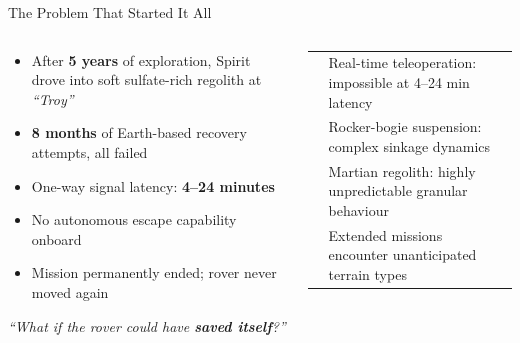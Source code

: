 \documentclass[aspectratio=169, 10pt]{beamer}
\newcommand{\keyword}[1]{\textbf{\color{MarsLight}#1}}
\newcommand{\teal}[1]{{\color{ArcticTeal}#1}}
\newcommand{\rust}[1]{{\color{MarsRust}#1}}
\begin{document}
\begin{frame}{The Problem That Started It All}
\begin{columns}[T]
   \vspace{-1.5em}
  \begin{tcolorbox}[mycard, title={\faRocket\; The Spirit Rover Incident: May 2009}]
    \small
    \begin{itemize}[leftmargin=1em, itemsep=3pt]
      \item[\rust{\faCircle[regular]}] After \keyword{5 years} of exploration, Spirit drove into soft
        sulfate-rich regolith at \textit{``Troy''}
      \item[\rust{\faCircle[regular]}] \keyword{8 months} of Earth-based recovery attempts, all failed
      \item[\rust{\faCircle[regular]}] One-way signal latency: \keyword{4–24 minutes}
      \item[\rust{\faCircle[regular]}] No autonomous escape capability onboard
      \item[\rust{\faCircle[regular]}] Mission permanently ended; rover never moved again
    \end{itemize}
     \vspace{-1.4em}
    \medskip
    \begin{tcolorbox}[highlight]
      \centering\small\textit{``What if the rover could have \textbf{saved itself}?''}
    \end{tcolorbox}
  \end{tcolorbox}

  \vspace{-1.1em}
  \begin{tcolorbox}[mycard, title={\faExclamationCircle\; Why Autonomous Recovery?}]
    \scriptsize
    \begin{tabular}{@{}cl@{}}
      \teal{\faWifi} & Real-time teleoperation: \rust{impossible} at 4–24 min latency \\[2pt]
      \teal{\faCog}  & Rocker-bogie suspension: complex sinkage dynamics \\[2pt]
      \teal{\faGlobe} & Martian regolith: highly unpredictable granular behaviour \\[2pt]
      \teal{\faClock} & Extended missions encounter unanticipated terrain types \\
    \end{tabular}
  \end{tcolorbox}


\end{columns}
\end{frame}
\end{document}
